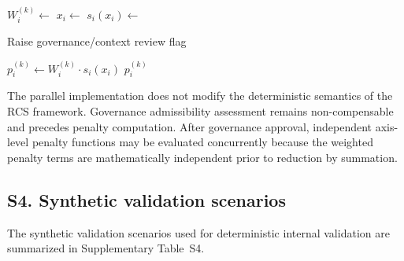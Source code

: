 \documentclass[preprint,12pt]{elsarticle}
\begin{document}
\begin{algorithm}[!htbp]
\caption{Axis-level RCS penalty function}
\label{alg:axis_penalty_function}
\footnotesize
\begin{algorithmic}[1]

    \State $W_i^{(k)} \gets$ 
    \State $x_i \gets$ 
    \State $s_i(x_i) \gets$ 

        \State Raise governance/context review flag
    \EndIf

    \State $p_i^{(k)} \gets W_i^{(k)} \cdot s_i(x_i)$
    \State \Return $p_i^{(k)}$
\EndProcedure

\end{algorithmic}
\normalsize
\end{algorithm}

The parallel implementation does not modify the deterministic semantics of the RCS framework. Governance admissibility assessment remains non-compensable and precedes penalty computation. After governance approval, independent axis-level penalty functions may be evaluated concurrently because the weighted penalty terms are mathematically independent prior to reduction by summation.

\subsection*{S4. Synthetic validation scenarios}

The synthetic validation scenarios used for deterministic internal validation are summarized in Supplementary Table~S4.
\end{document}
